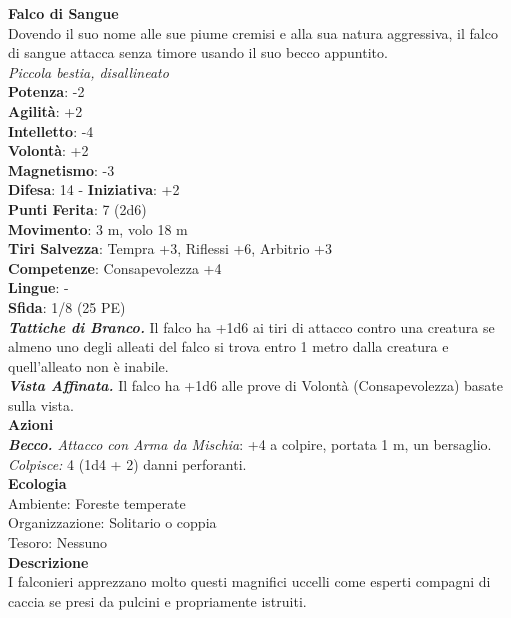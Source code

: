 \begin{multicols}{2}
\medskip\textbf{Falco di Sangue}\\
Dovendo il suo nome alle sue piume cremisi e alla sua natura aggressiva, il falco di sangue attacca senza timore usando il suo becco appuntito.\\
\emph{Piccola bestia, disallineato}\\
\textbf{Potenza}: -2\\
\textbf{Agilità}: +2\\
\textbf{Intelletto}: -4\\
\textbf{Volontà}: +2\\
\textbf{Magnetismo}: -3\\
\textbf{Difesa}: 14 - \textbf{Iniziativa}: +2\\
\textbf{Punti Ferita}: 7 (2d6)\\
\textbf{Movimento}: 3 m, volo 18 m\\
\textbf{Tiri Salvezza}: Tempra +3, Riflessi +6, Arbitrio +3 \\
\textbf{Competenze}: Consapevolezza +4\\
\textbf{Lingue}: -\\
\textbf{Sfida}: 1/8 (25 PE)\smallskip\\
\emph{\textbf{Tattiche di Branco.}} Il falco ha +1d6 ai tiri di attacco contro una creatura se almeno uno degli alleati del falco si trova entro 1 metro dalla creatura e quell'alleato non è inabile.\\
\emph{\textbf{Vista Affinata.}} Il falco ha +1d6 alle prove di Volontà (Consapevolezza) basate sulla vista.\\
\smallskip\textbf{Azioni}\\
\emph{\textbf{Becco.} Attacco con Arma da Mischia}: +4 a colpire, portata 1 m, un bersaglio.\\
\emph{Colpisce:} 4 (1d4 + 2) danni perforanti.\\
\textbf{Ecologia}\\
Ambiente: Foreste temperate\\
Organizzazione: Solitario o coppia\\
Tesoro: Nessuno\\
\textbf{Descrizione}\\
I falconieri apprezzano molto questi magnifici uccelli come esperti compagni di caccia se presi da pulcini e propriamente istruiti. \\



\end{multicols}
